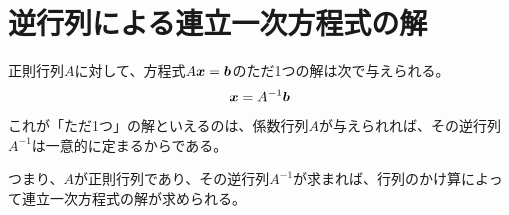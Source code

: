 \documentclass[../../../topic_linear-algebra]{subfiles}
\begin{document}
\sectionline
\section{逆行列による連立一次方程式の解}

正則行列$A$に対して、方程式$A\vb*{x} = \vb*{b}$のただ1つの解は次で与えられる。
\begin{equation*}
  \vb*{x} = A^{-1} \vb*{b}
\end{equation*}

これが「ただ1つ」の解といえるのは、係数行列$A$が与えられれば、その逆行列$A^{-1}$は一意的に定まるからである。

\br

つまり、$A$が正則行列であり、その逆行列$A^{-1}$が求まれば、行列のかけ算によって連立一次方程式の解が求められる。
\end{document}
